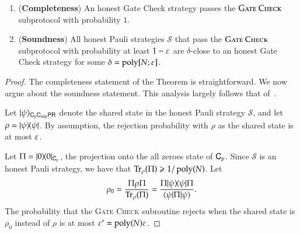 \begin{lemma}	
\label{lem:prop_check}
\leavevmode
\begin{enumerate}
\item (\textbf{Completeness}) An honest Gate Check strategy passes the $\textsc{Gate Check}$ subprotocol with probability $1$. 
\item (\textbf{Soundness}) All honest Pauli strategies $\mathcal{S}$ that pass the $\textsc{Gate Check}$ subprotocol with probability at least $1 - \varepsilon$ are $\delta$-close to an honest Gate Check strategy for some $\delta = \operatorname{poly}[N;\varepsilon]$.
\end{enumerate}
\end{lemma}
\begin{proof}
	The completeness statement of the Theorem is straightforward. We now argue about the soundness statement. This analysis largely follows that of~\cite{ji2016compression}. 
	
	Let $|\psi\rangle_{{\mathsf{C}}_p {\mathsf{C}}_{mip} {\mathsf{P}} {\mathsf{R}}}$ denote the shared state in the honest Pauli strategy $\mathcal{S}$, and let $\rho = |\psi\rangle\! \langle \psi|$. By assumption, the rejection probability with $\rho$ as the shared state is at most $\varepsilon$.
	
	Let $\Pi = |0\rangle\! \langle 0|_{{\mathsf{C}}_p}$, the projection onto the all zeroes state of ${\mathsf{C}}_p$. Since $\mathcal{S}$ is an honest Pauli strategy, we have that $\operatorname{Tr}_\rho (\Pi) \geqslant 1/\operatorname{poly}(N)$. Let 
	\[
		\rho_0 = \frac{\Pi \rho \Pi}{\operatorname{Tr}_\rho(\Pi)} = \frac{\Pi |\psi\rangle\! \langle \psi| \Pi}{\langle\psi| \Pi |\psi\rangle}.
	\]
	The probability that the \textsc{Gate Check} subroutine rejects when the shared state is $\rho_0$ instead of $\rho$ is at most $\varepsilon' = \operatorname{poly}(N) \varepsilon$. 
	

\end{proof}
